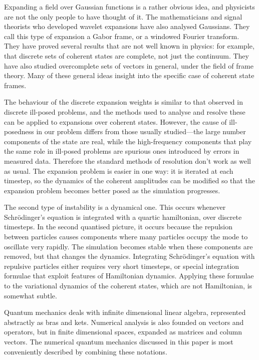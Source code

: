 Expanding a field over Gaussian functions is a rather obvious idea, and physicists are not the only people to have thought of it.  The mathematicians and signal theorists who developed wavelet expansions have also analysed Gaussians.  They call this type of expansion a Gabor frame, or a windowed Fourier transform.  They have proved several results that are not well known in physics: for example, that discrete sets of coherent states are complete, not just the continuum.  They have also studied overcomplete sets of vectors in general, under the field of frame theory.  Many of these general ideas insight into the specific case of coherent state frames.

The behaviour of the discrete expansion weights is similar to that observed in discrete ill-posed problems, and the methods used to analyse and resolve these can be applied to expansions over coherent states.  However, the cause of ill-posedness in our problem differs from those usually studied—the large number components of the state are real, while the high-frequency components that play the same role in ill-posed problems are spurious ones introduced by errors in measured data.  Therefore the standard methods of resolution don't work as well as usual.  The expansion problem is easier in one way: it is iterated at each timestep, so the dynamics of the coherent amplitudes can be modified so that the expansion problem becomes better posed as the simulation progresses.

The second type of instability is a dynamical one.  This occurs whenever Schrödinger's equation is integrated with a quartic hamiltonian, over discrete timesteps.  In the second quantised picture, it occurs because the repulsion between particles causes components where many particles occupy the mode to oscillate very rapidly.  The simulation becomes stable when these components are removed, but that changes the dynamics.  Integrating Schrödinger's equation with repulsive particles either requires very short timesteps, or special integration formulae that exploit features of Hamiltonian dynamics.  Applying these formulae to the variational dynamics of the coherent states, which are not Hamiltonian, is somewhat subtle.



Quantum mechanics deals with infinite dimensional linear algebra, represented abstractly as bras and kets.  Numerical analysis is also founded on vectors and operators, but in finite dimensional spaces, expanded as matrices and column vectors.  The numerical quantum mechanics discussed in this paper is most conveniently described by combining these notations.

